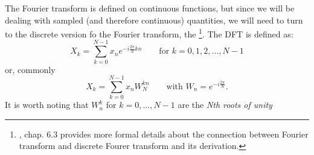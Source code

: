 \documentclass[class=article,crop=false]{standalone}
\begin{document}
The Fourier transform is defined on continuous functions, but since we will be dealing with sampled (and therefore continuous) quantities, we will need to turn to the discrete version fo the Fourier transform, the \footnote{\cite{FFTbook}, chap. 6.3 provides more formal details about the connection between Fourier transform and discrete Fourer transform and its derivation.}. The DFT is defined as:
\begin{equation}
	X_k=\sum_{k=0}^{N-1}x_ne^{-i\frac{2\pi}{N}kn}\qquad \text{for }k=0,1,2,\ldots,N-1
\end{equation}
or, commonly
\begin{equation}
	X_k=\sum_{k=0}^{N-1}x_nW_{N}^{kn}\qquad\text{with }W_n=e^{-i\frac{2\pi}{N}}.
\end{equation}
It is worth noting that $W_n^k$ for $k=0,\ldots,N-1$ are the \textit{Nth roots of unity}
\end{document}
